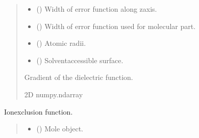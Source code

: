 \documentclass[letterpaper,10pt,english]{sphinxmanual}
\begin{document}
\begin{fulllineitems}
\begin{fulllineitems}
\begin{quote}
\begin{description}
\begin{itemize}
\item {} 
\sphinxAtStartPar
{} () \textendash{} Width of error function along z\sphinxhyphen{}axis.

\item {} 
\sphinxAtStartPar
{} () \textendash{} Width of error function used for molecular part.

\item {} 
\sphinxAtStartPar
{} () \textendash{} Atomic radii.

\item {} 
\sphinxAtStartPar
{} () \textendash{} Solvent\sphinxhyphen{}accessible surface.

\end{itemize}

\sphinxAtStartPar
Gradient of the dielectric function.

\sphinxAtStartPar
2D numpy.ndarray

\end{description}\end{quote}

\end{fulllineitems}


\begin{fulllineitems}
\label{\detokenize{fcdft.solvent:fcdft.solvent.pbe.PBE.make_lambda}}
\pysigstartsignatures
\pysiglinewithargsret
{}
{\sphinxparamcomma {}\sphinxparamcomma {}\sphinxparamcomma {}\sphinxparamcomma {}\sphinxparamcomma {}\sphinxparamcomma {}\sphinxparamcomma {}}
{}
\pysigstopsignatures
\sphinxAtStartPar
Ion\sphinxhyphen{}exclusion function.
\begin{quote}\begin{description}
\begin{itemize}
\item {} 
\sphinxAtStartPar
{} () \textendash{} Mole object.


\end{itemize}
\end{description}
\end{quote}
\end{fulllineitems}
\end{fulllineitems}
\end{document}
